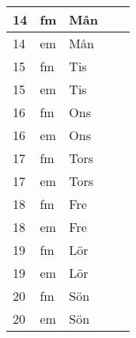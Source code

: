 \documentclass[a4paper]{article}
\begin{document}
\begin{table}[ht!]
\begin{tabular}{lllp{7cm}p{7cm}}
\multicolumn{1}{|l|}{14} & \multicolumn{1}{l|}{fm} & \multicolumn{1}{l|}{Mån} & \multicolumn{1}{l|}{} & \multicolumn{1}{l|}{} \\ \hline
\multicolumn{1}{|l|}{14} & \multicolumn{1}{l|}{em} & \multicolumn{1}{l|}{Mån} & \multicolumn{1}{l|}{} & \multicolumn{1}{l|}{} \\ \hline    

\multicolumn{1}{|l|}{15} & \multicolumn{1}{l|}{fm} & \multicolumn{1}{l|}{Tis} & \multicolumn{1}{l|}{} & \multicolumn{1}{l|}{} \\ \hline
\multicolumn{1}{|l|}{15} & \multicolumn{1}{l|}{em} & \multicolumn{1}{l|}{Tis} & \multicolumn{1}{l|}{} & \multicolumn{1}{l|}{} \\ \hline    

\multicolumn{1}{|l|}{16} & \multicolumn{1}{l|}{fm} & \multicolumn{1}{l|}{Ons} & \multicolumn{1}{l|}{} & \multicolumn{1}{l|}{} \\ \hline
\multicolumn{1}{|l|}{16} & \multicolumn{1}{l|}{em} & \multicolumn{1}{l|}{Ons} & \multicolumn{1}{l|}{} & \multicolumn{1}{l|}{} \\ \hline    

\multicolumn{1}{|l|}{17} & \multicolumn{1}{l|}{fm} & \multicolumn{1}{l|}{Tors} & \multicolumn{1}{l|}{} & \multicolumn{1}{l|}{} \\ \hline
\multicolumn{1}{|l|}{17} & \multicolumn{1}{l|}{em} & \multicolumn{1}{l|}{Tors} & \multicolumn{1}{l|}{} & \multicolumn{1}{l|}{} \\ \hline    

\multicolumn{1}{|l|}{18} & \multicolumn{1}{l|}{fm} & \multicolumn{1}{l|}{Fre} & \multicolumn{1}{l|}{} & \multicolumn{1}{l|}{} \\ \hline
\multicolumn{1}{|l|}{18} & \multicolumn{1}{l|}{em} & \multicolumn{1}{l|}{Fre} & \multicolumn{1}{l|}{} & \multicolumn{1}{l|}{} \\ \hline    

\multicolumn{1}{|l|}{19} & \multicolumn{1}{l|}{fm} & \multicolumn{1}{l|}{Lör} & \multicolumn{1}{l|}{} & \multicolumn{1}{l|}{} \\ \hline
\multicolumn{1}{|l|}{19} & \multicolumn{1}{l|}{em} & \multicolumn{1}{l|}{Lör} & \multicolumn{1}{l|}{} & \multicolumn{1}{l|}{} \\ \hline    

\multicolumn{1}{|l|}{20} & \multicolumn{1}{l|}{fm} & \multicolumn{1}{l|}{Sön} & \multicolumn{1}{l|}{} & \multicolumn{1}{l|}{} \\ \hline
\multicolumn{1}{|l|}{20} & \multicolumn{1}{l|}{em} & \multicolumn{1}{l|}{Sön} & \multicolumn{1}{l|}{} & \multicolumn{1}{l|}{} \\ \hline    


\end{tabular}
\end{table}
\end{document}
